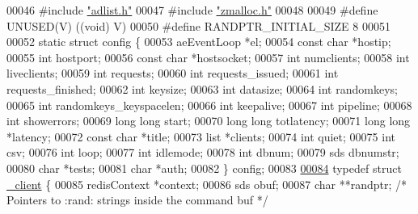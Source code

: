 \begin{DoxyCode}
00046 \textcolor{preprocessor}{#}\textcolor{preprocessor}{include} \hyperlink{adlist_8h}{"adlist.h"}
00047 \textcolor{preprocessor}{#}\textcolor{preprocessor}{include} \hyperlink{zmalloc_8h}{"zmalloc.h"}
00048 
00049 \textcolor{preprocessor}{#}\textcolor{preprocessor}{define} \textcolor{preprocessor}{UNUSED}\textcolor{preprocessor}{(}\textcolor{preprocessor}{V}\textcolor{preprocessor}{)} \textcolor{preprocessor}{(}\textcolor{preprocessor}{(}\textcolor{keywordtype}{void}\textcolor{preprocessor}{)} \textcolor{preprocessor}{V}\textcolor{preprocessor}{)}
00050 \textcolor{preprocessor}{#}\textcolor{preprocessor}{define} \textcolor{preprocessor}{RANDPTR\_INITIAL\_SIZE} 8
00051 
00052 \textcolor{keyword}{static} \textcolor{keyword}{struct} config \{
00053     aeEventLoop *el;
00054     \textcolor{keyword}{const} \textcolor{keywordtype}{char} *hostip;
00055     \textcolor{keywordtype}{int} hostport;
00056     \textcolor{keyword}{const} \textcolor{keywordtype}{char} *hostsocket;
00057     \textcolor{keywordtype}{int} numclients;
00058     \textcolor{keywordtype}{int} liveclients;
00059     \textcolor{keywordtype}{int} requests;
00060     \textcolor{keywordtype}{int} requests\_issued;
00061     \textcolor{keywordtype}{int} requests\_finished;
00062     \textcolor{keywordtype}{int} keysize;
00063     \textcolor{keywordtype}{int} datasize;
00064     \textcolor{keywordtype}{int} randomkeys;
00065     \textcolor{keywordtype}{int} randomkeys\_keyspacelen;
00066     \textcolor{keywordtype}{int} keepalive;
00067     \textcolor{keywordtype}{int} pipeline;
00068     \textcolor{keywordtype}{int} showerrors;
00069     \textcolor{keywordtype}{long} \textcolor{keywordtype}{long} start;
00070     \textcolor{keywordtype}{long} \textcolor{keywordtype}{long} totlatency;
00071     \textcolor{keywordtype}{long} \textcolor{keywordtype}{long} *latency;
00072     \textcolor{keyword}{const} \textcolor{keywordtype}{char} *title;
00073     list *clients;
00074     \textcolor{keywordtype}{int} quiet;
00075     \textcolor{keywordtype}{int} csv;
00076     \textcolor{keywordtype}{int} loop;
00077     \textcolor{keywordtype}{int} idlemode;
00078     \textcolor{keywordtype}{int} dbnum;
00079     sds dbnumstr;
00080     \textcolor{keywordtype}{char} *tests;
00081     \textcolor{keywordtype}{char} *auth;
00082 \} config;
00083 
\hyperlink{struct__client}{00084} \textcolor{keyword}{typedef} \textcolor{keyword}{struct} \hyperlink{struct__client}{\_client} \{
00085     redisContext *context;
00086     sds obuf;
00087     \textcolor{keywordtype}{char} **randptr;         \textcolor{comment}{/* Pointers to :rand: strings inside the command buf */}

\end{DoxyCode}
